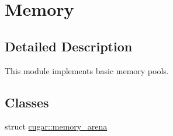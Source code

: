 \hypertarget{group___memory}{}\section{Memory}
\label{group___memory}


\subsection{Detailed Description}
This module implements basic memory pools. \subsection*{Classes}
\begin{DoxyCompactItemize}
\item 
struct \hyperlink{structcugar_1_1memory__arena}{cugar\+::memory\+\_\+arena}
\end{DoxyCompactItemize}
